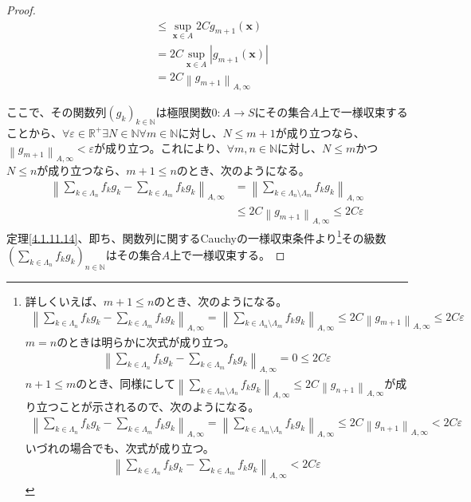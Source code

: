 \documentclass[dvipdfmx]{jsarticle}
\begin{document}
\begin{proof}
\begin{align*}
&\leq \sup_{\mathbf{x} \in A}{2Cg_{m + 1}\left( \mathbf{x} \right)}\\
&= 2C\sup_{\mathbf{x} \in A}\left| g_{m + 1}\left( \mathbf{x} \right) \right|\\
&= 2C\left\| g_{m + 1} \right\|_{A,\infty}
\end{align*}\par
ここで、その関数列$\left( g_{k} \right)_{k \in \mathbb{N}}$は極限関数$0:A \rightarrow S$にその集合$A$上で一様収束することから、$\forall\varepsilon \in \mathbb{R}^{+}\exists N \in \mathbb{N}\forall m \in \mathbb{N}$に対し、$N \leq m + 1$が成り立つなら、$\left\| g_{m + 1} \right\|_{A,\infty} < \varepsilon$が成り立つ。これにより、$\forall m,n \in \mathbb{N}$に対し、$N \leq m$かつ$N \leq n$が成り立つなら、$m + 1 \leq n$のとき、次のようになる。
\begin{align*}
\left\| \sum_{k \in \varLambda_{n}} {f_{k}g_{k}} - \sum_{k \in \varLambda_{m}} {f_{k}g_{k}} \right\|_{A,\infty} &= \left\| \sum_{k \in \varLambda_{n} \setminus \varLambda_{m}} {f_{k}g_{k}} \right\|_{A,\infty}\\
&\leq 2C\left\| g_{m + 1} \right\|_{A,\infty} \leq 2C\varepsilon
\end{align*}
定理\ref{4.1.11.14}、即ち、関数列に関するCauchyの一様収束条件より\footnote{詳しくいえば、$m + 1 \leq n$のとき、次のようになる。
\begin{align*}
\left\| \sum_{k \in \varLambda_{n}} {f_{k}g_{k}} - \sum_{k \in \varLambda_{m}} {f_{k}g_{k}} \right\|_{A,\infty} = \left\| \sum_{k \in \varLambda_{n} \setminus \varLambda_{m}} {f_{k}g_{k}} \right\|_{A,\infty} \leq 2C\left\| g_{m + 1} \right\|_{A,\infty} \leq 2C\varepsilon
\end{align*}
$m = n$のときは明らかに次式が成り立つ。
\begin{align*}
\left\| \sum_{k \in \varLambda_{n}} {f_{k}g_{k}} - \sum_{k \in \varLambda_{m}} {f_{k}g_{k}} \right\|_{A,\infty} = 0 \leq 2C\varepsilon
\end{align*}
$n + 1 \leq m$のとき、同様にして$\left\| \sum_{k \in \varLambda_{m} \setminus \varLambda_{n}} {f_{k}g_{k}} \right\|_{A,\infty} \leq 2C\left\| g_{n + 1} \right\|_{A,\infty}$が成り立つことが示されるので、次のようになる。
\begin{align*}
\left\| \sum_{k \in \varLambda_{n}} {f_{k}g_{k}} - \sum_{k \in \varLambda_{m}} {f_{k}g_{k}} \right\|_{A,\infty} = \left\| \sum_{k \in \varLambda_{m} \setminus \varLambda_{n}} {f_{k}g_{k}} \right\|_{A,\infty} \leq 2C\left\| g_{n + 1} \right\|_{A,\infty} < 2C\varepsilon
\end{align*}
いづれの場合でも、次式が成り立つ。
\begin{align*}
\left\| \sum_{k \in \varLambda_{n}} {f_{k}g_{k}} - \sum_{k \in \varLambda_{m}} {f_{k}g_{k}} \right\|_{A,\infty} < 2C\varepsilon
\end{align*}}その級数$\left( \sum_{k \in \varLambda_{n}} {f_{k}g_{k}} \right)_{n \in \mathbb{N}}$はその集合$A$上で一様収束する。
\end{proof}
\end{document}
